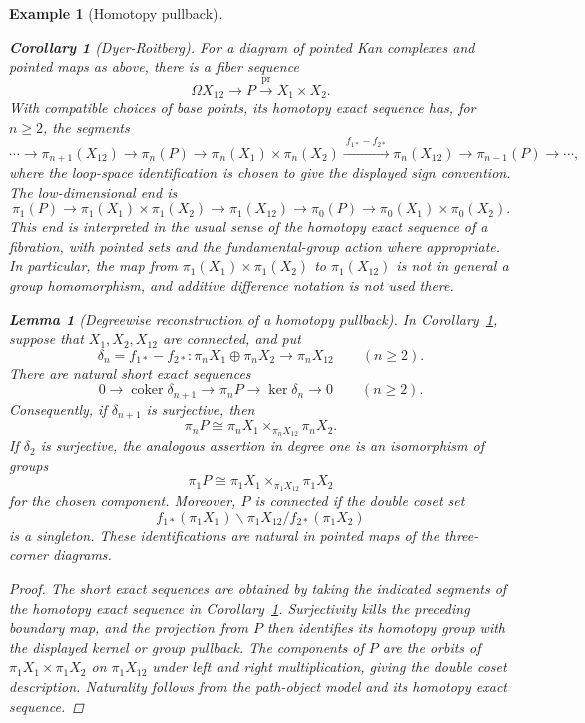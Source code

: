 \documentclass[11pt,a4paper]{article}
\newtheorem{lemma}[theorem]{Lemma}
\newtheorem{example}[theorem]{Example}
\newtheorem{corollary}[theorem]{Corollary}
\begin{document}
\begin{example}[Homotopy pullback]
\begin{corollary}[Dyer-Roitberg]\label{dr}
For a diagram of pointed Kan complexes and pointed maps as above, there
is a fiber sequence
\[
 \Omega X_{12}\longrightarrow P
 \xrightarrow{\operatorname{pr}}X_1\times X_2.
\]
With compatible choices of base points, its homotopy exact sequence has,
for $n\geq2$, the segments
\[
 \cdots\longrightarrow\pi_{n+1}(X_{12})
 \longrightarrow\pi_n(P)
 \longrightarrow\pi_n(X_1)\times\pi_n(X_2)
 \xrightarrow{\ f_{1*}-f_{2*}\ }\pi_n(X_{12})
 \longrightarrow\pi_{n-1}(P)\longrightarrow\cdots,
\]
where the loop-space identification is chosen to give the displayed
sign convention.  The low-dimensional end is
\[
 \pi_1(P)\longrightarrow\pi_1(X_1)\times\pi_1(X_2)
 \longrightarrow\pi_1(X_{12})\longrightarrow\pi_0(P)
 \longrightarrow\pi_0(X_1)\times\pi_0(X_2).
\]
This end is interpreted in the usual sense of the homotopy exact
sequence of a fibration, with pointed sets and the fundamental-group
action where appropriate.  In particular, the map from
$\pi_1(X_1)\times\pi_1(X_2)$ to $\pi_1(X_{12})$ is not in general a
group homomorphism, and additive difference notation is not used there.
\end{corollary}
\begin{lemma}[Degreewise reconstruction of a homotopy pullback]
\label{degreewise-pullback}
In Corollary~\ref{dr}, suppose that $X_1,X_2,X_{12}$ are connected,
and put
\[
 \delta_n=f_{1*}-f_{2*}:\pi_nX_1\oplus\pi_nX_2\longrightarrow\pi_nX_{12}
 \qquad(n\geq2).
\]
There are natural short exact sequences
\[
 0\longrightarrow\operatorname{coker}\delta_{n+1}
 \longrightarrow\pi_nP\longrightarrow\ker\delta_n
 \longrightarrow0\qquad(n\geq2).
\]
Consequently, if $\delta_{n+1}$ is surjective, then
\[
 \pi_nP\cong\pi_nX_1\times_{\pi_nX_{12}}\pi_nX_2.
\]
If $\delta_2$ is surjective, the analogous assertion in degree one is
an isomorphism of groups
\[
 \pi_1P\cong\pi_1X_1\times_{\pi_1X_{12}}\pi_1X_2
\]
for the chosen component.  Moreover, $P$ is connected if the double
coset set
\[
 f_{1*}(\pi_1X_1)\backslash\pi_1X_{12}/f_{2*}(\pi_1X_2)
\]
is a singleton.  These identifications are natural in pointed maps
of the three-corner diagrams.
\end{lemma}
\begin{proof}
The short exact sequences are obtained by taking the indicated
segments of the homotopy exact sequence in Corollary~\ref{dr}.
Surjectivity kills the preceding boundary map, and the projection
from $P$ then identifies its homotopy group with the displayed kernel
or group pullback.  The components of $P$ are the orbits of
$\pi_1X_1\times\pi_1X_2$ on $\pi_1X_{12}$ under left and right
multiplication, giving the double coset description.  Naturality
follows from the path-object model and its homotopy exact sequence.
\end{proof}


\end{example}
\end{document}
